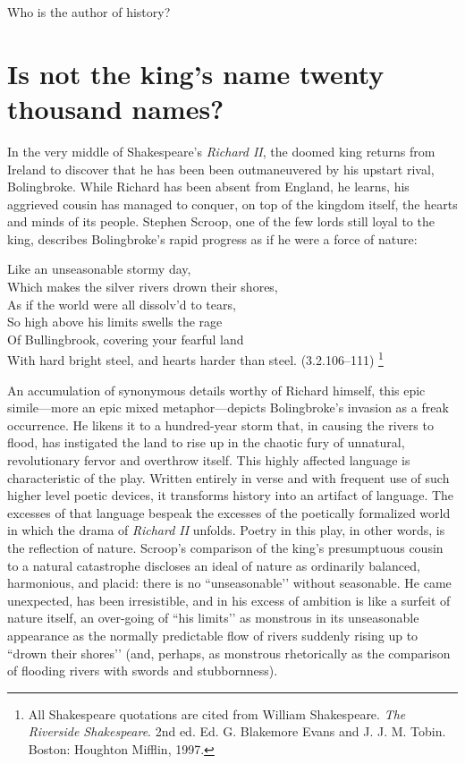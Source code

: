 Who is the author of history?

\chapter{Is not the king's name twenty thousand names?\label{ch:RichardII}}
In the very middle of Shakespeare’s \emph{Richard II}, the doomed king returns from Ireland to discover that he has been been outmaneuvered by his upstart rival, Bolingbroke.
While Richard has been absent from England, he learns, his aggrieved cousin has managed to conquer, on top of the kingdom itself, the hearts and minds of its people.
Stephen Scroop, one of the few lords still loyal to the king, describes Bolingbroke’s rapid progress as if he were a force of nature: 	
\begin{vq}
Like an unseasonable stormy day, \\
Which makes the silver rivers drown their shores, \\
As if the world were all dissolv’d to tears, \\
So high above his limits swells the rage \\
Of Bullingbrook, covering your fearful land \\
With hard bright steel, and hearts harder than steel. (3.2.106--111)
\footnote{All Shakespeare quotations are cited from William Shakespeare. \emph{The Riverside Shakespeare}. 2nd ed. Ed. G. Blakemore Evans and J. J. M. Tobin. Boston: Houghton Mifflin, 1997.}
\end{vq}
An accumulation of synonymous details worthy of Richard himself, this epic simile---more an epic mixed metaphor---depicts Bolingbroke’s invasion as a freak occurrence.
He likens it to a hundred-year storm that, in causing the rivers to flood, has instigated the land to rise up in the chaotic fury of unnatural, revolutionary fervor and overthrow itself.
This highly affected language is characteristic of the play.
Written entirely in verse and with frequent use of such higher level poetic devices, it transforms history into an artifact of language.
The excesses of that language bespeak the excesses of the poetically formalized world in which the drama of \emph{Richard II} unfolds.
Poetry in this play, in other words, is the reflection of nature.
Scroop’s comparison of the king’s presumptuous cousin to a natural catastrophe discloses an ideal of nature as ordinarily balanced, harmonious, and placid: there is no ``unseasonable’’ without seasonable.
He came unexpected, has been irresistible, and in his excess of ambition is like a surfeit of nature itself, an over-going of ``his limits’’ as monstrous in its unseasonable appearance as the normally predictable flow of rivers suddenly rising up to ``drown their shores’’ (and, perhaps, as monstrous rhetorically as the comparison of flooding rivers with swords and stubbornness).
